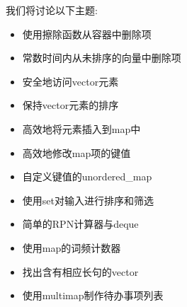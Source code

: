 我们将讨论以下主题:

\begin{itemize}
\item 
使用擦除函数从容器中删除项

\item 
常数时间内从未排序的向量中删除项

\item 
安全地访问vector元素

\item 
保持vector元素的排序

\item 
高效地将元素插入到map中

\item 
高效地修改map项的键值

\item 
自定义键值的unordered\_map

\item 
使用set对输入进行排序和筛选

\item 
简单的RPN计算器与deque

\item 
使用map的词频计数器

\item 
找出含有相应长句的vector

\item 
使用multimap制作待办事项列表
\end{itemize}












